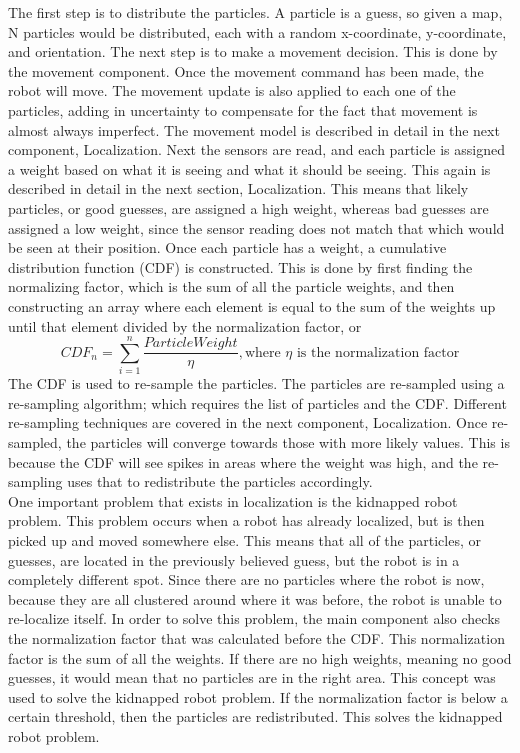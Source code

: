 \documentclass{article}
\newcommand\tab[1][0.5cm]{\hspace*{#1}}
\begin{document}
The first step is to distribute the particles. A particle is a guess, so given a map, N particles would be distributed, each with a random x-coordinate, y-coordinate, and orientation. The next step is to make a movement decision. This is done by the movement component. Once the movement command has been made, the robot will move. The movement update is also applied to each one of the particles, adding in uncertainty to compensate for the fact that movement is almost always imperfect\citep{ProbRob}. The movement model is described in detail in the next component, Localization. Next the sensors are read, and each particle is assigned a weight based on what it is seeing and what it should be seeing.  This again is described in detail in the next section, Localization. This means that likely particles, or good guesses, are assigned a high weight, whereas bad guesses are assigned a low weight, since the sensor reading does not match that which would be seen at their position. Once each particle has a weight, a cumulative distribution function (CDF) is constructed. This is done by first finding the normalizing factor, which is the sum of all the particle weights, and then constructing an array where each element is equal to the sum of the weights up until that element divided by the normalization factor, or
\[CDF_n = \sum_{i=1}^{n} \frac{ParticleWeight}{\eta}, \textrm{where }{\eta}\textrm{ is the normalization factor} \]
\tab The CDF is used to re-sample the particles. The particles are re-sampled using a re-sampling algorithm; which requires the list of particles and the CDF. Different re-sampling techniques are covered in the next component, Localization. Once re-sampled, the particles will converge towards those with more likely values. This is because the CDF will see spikes in areas where the weight was high, and the re-sampling uses that to redistribute the particles accordingly.\\

One important problem that exists in localization is the kidnapped robot problem\citep{ProbRob}. This problem occurs when a robot has already localized, but is then picked up and moved somewhere else. This means that all of the particles, or guesses, are located in the previously believed guess, but the robot is in a completely different spot. Since there are no particles where the robot is now, because they are all clustered around where it was before, the robot is unable to re-localize itself. In order to solve this problem, the main component also checks the normalization factor that was calculated before the CDF. This normalization factor is the sum of all the weights. If there are no high weights, meaning no good guesses, it would mean that no particles are in the right area. This concept was used to solve the kidnapped robot problem. If the normalization factor is below a certain threshold, then the particles are redistributed. This solves the kidnapped robot problem.\\
\end{document}
